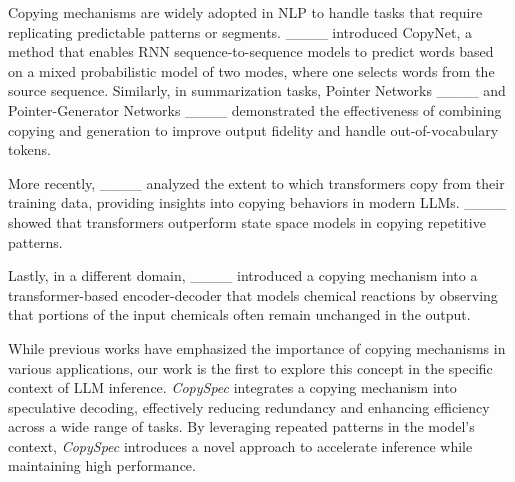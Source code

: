 Copying mechanisms are widely adopted in NLP to handle tasks that require replicating predictable patterns or segments. ____ introduced CopyNet, a method that enables RNN sequence-to-sequence models to predict words based on a mixed probabilistic model of two modes, where one selects words from the source sequence.
Similarly, in summarization tasks, Pointer Networks ____ and Pointer-Generator Networks ____ demonstrated the effectiveness of combining copying and generation to improve output fidelity and handle out-of-vocabulary tokens. 

More recently, ____ analyzed the extent to which transformers copy from their training data, providing insights into copying behaviors in modern LLMs. ____ showed that transformers outperform state space models in copying repetitive patterns. 

Lastly, in a different domain, ____ introduced a copying mechanism into a transformer-based encoder-decoder that models chemical reactions by observing that  portions of the input chemicals often remain unchanged in the output.


While previous works have emphasized the importance of copying mechanisms in various applications, our work is the first to explore this concept in the specific context of LLM inference. \textit{CopySpec} integrates a 
copying mechanism into speculative decoding, effectively reducing redundancy and enhancing efficiency across a wide range of tasks. By leveraging repeated patterns in the model's context, \textit{CopySpec} introduces a novel approach to accelerate inference while maintaining high performance.


